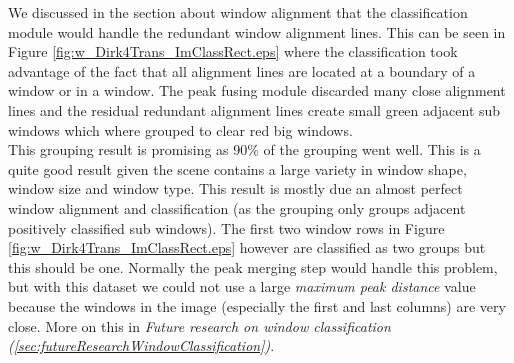 









We discussed in the section about window alignment that the classification
module would handle the redundant window alignment lines. 
This can be seen in Figure \ref{fig:w_Dirk4Trans_ImClassRect.eps} where the 
classification took advantage of the fact that all alignment lines are located at a boundary of a window or in a window. 
The peak fusing module discarded many close alignment lines and the residual redundant alignment lines create
small green adjacent sub windows which where grouped to clear red big windows.\\

This grouping result is promising as 90\% of the grouping went well.
This is a quite good result given the scene contains a large variety in window
shape, window size and window type.  This result is mostly due an almost perfect window alignment and classification 
(as the grouping only groups adjacent positively classified sub windows).
The first two window rows in Figure \ref{fig:w_Dirk4Trans_ImClassRect.eps}
however are classified as two groups but this should be one.
Normally the peak merging step would handle this problem, but with this dataset
we could not use a large \emph{maximum peak distance} value because the windows
in the image (especially the first and last columns) are very close.  More on
this in \emph{Future research on window classification
(\ref{sec:futureResearchWindowClassification})}.



